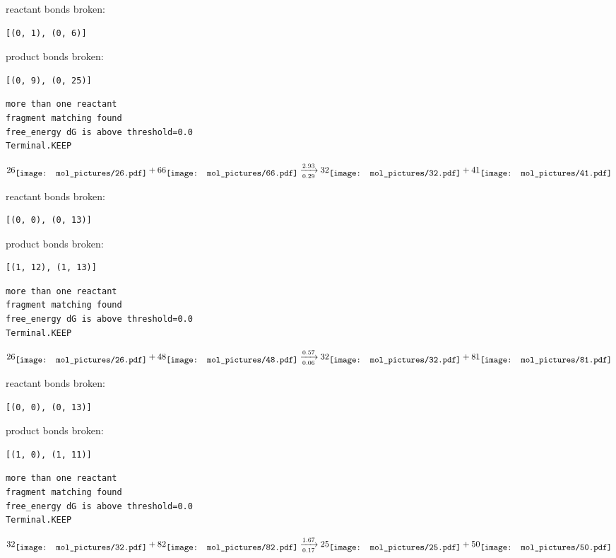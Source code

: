 \documentclass{article}
\begin{document}
reactant bonds broken:\begin{verbatim}
[(0, 1), (0, 6)]
\end{verbatim}
product bonds broken:\begin{verbatim}
[(0, 9), (0, 25)]
\end{verbatim}




\vspace{1cm}
\begin{verbatim}
more than one reactant
fragment matching found
free_energy dG is above threshold=0.0
Terminal.KEEP
\end{verbatim}
$$
26
\raisebox{-.5\height}{\texttt{[image: mol\_pictures/26.pdf]}}
+
66
\raisebox{-.5\height}{\texttt{[image: mol\_pictures/66.pdf]}}
\xrightarrow[0.29]{2.93}
32
\raisebox{-.5\height}{\texttt{[image: mol\_pictures/32.pdf]}}
+
41
\raisebox{-.5\height}{\texttt{[image: mol\_pictures/41.pdf]}}
$$


reactant bonds broken:\begin{verbatim}
[(0, 0), (0, 13)]
\end{verbatim}
product bonds broken:\begin{verbatim}
[(1, 12), (1, 13)]
\end{verbatim}




\vspace{1cm}
\begin{verbatim}
more than one reactant
fragment matching found
free_energy dG is above threshold=0.0
Terminal.KEEP
\end{verbatim}
$$
26
\raisebox{-.5\height}{\texttt{[image: mol\_pictures/26.pdf]}}
+
48
\raisebox{-.5\height}{\texttt{[image: mol\_pictures/48.pdf]}}
\xrightarrow[0.06]{0.57}
32
\raisebox{-.5\height}{\texttt{[image: mol\_pictures/32.pdf]}}
+
81
\raisebox{-.5\height}{\texttt{[image: mol\_pictures/81.pdf]}}
$$


reactant bonds broken:\begin{verbatim}
[(0, 0), (0, 13)]
\end{verbatim}
product bonds broken:\begin{verbatim}
[(1, 0), (1, 11)]
\end{verbatim}




\vspace{1cm}
\begin{verbatim}
more than one reactant
fragment matching found
free_energy dG is above threshold=0.0
Terminal.KEEP
\end{verbatim}
$$
32
\raisebox{-.5\height}{\texttt{[image: mol\_pictures/32.pdf]}}
+
82
\raisebox{-.5\height}{\texttt{[image: mol\_pictures/82.pdf]}}
\xrightarrow[0.17]{1.67}
25
\raisebox{-.5\height}{\texttt{[image: mol\_pictures/25.pdf]}}
+
50
\raisebox{-.5\height}{\texttt{[image: mol\_pictures/50.pdf]}}
$$
\end{document}
